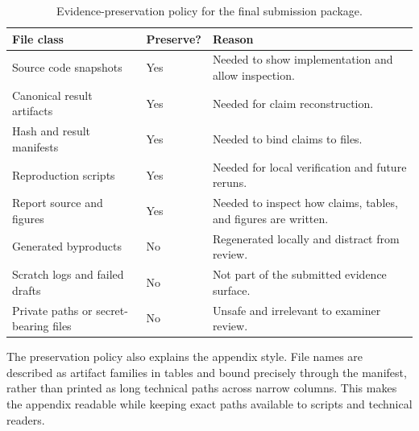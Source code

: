 \begin{table}[htbp]
\centering
\caption{Evidence-preservation policy for the final submission package.}
\label{tab:artifact-preservation-policy}
\tighttable
\begin{tabularx}{\textwidth}{@{}L{2.15cm}YY@{}}
\toprule
File class & Preserve? & Reason \\
\midrule
Source code snapshots & Yes & Needed to show implementation and allow inspection. \\
Canonical result artifacts & Yes & Needed for claim reconstruction. \\
Hash and result manifests & Yes & Needed to bind claims to files. \\
Reproduction scripts & Yes & Needed for local verification and future reruns. \\
Report source and figures & Yes & Needed to inspect how claims, tables, and figures are written. \\
Generated byproducts & No & Regenerated locally and distract from review. \\
Scratch logs and failed drafts & No & Not part of the submitted evidence surface. \\
Private paths or secret-bearing files & No & Unsafe and irrelevant to examiner review. \\
\bottomrule
\end{tabularx}
\end{table}

The preservation policy also explains the appendix style. File names are described as artifact families in tables and bound precisely through the manifest, rather than printed as long technical paths across narrow columns. This makes the appendix readable while keeping exact paths available to scripts and technical readers.
